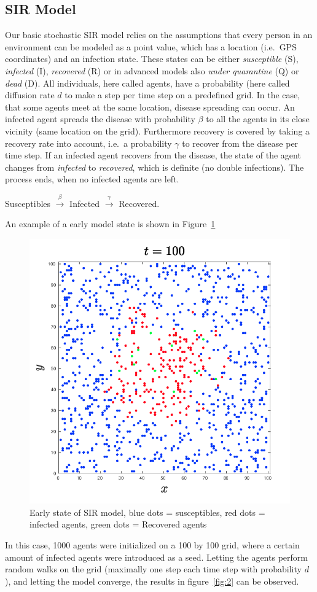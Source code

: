 \subsection{SIR Model}

Our basic stochastic SIR model relies on the assumptions that every person in an environment can be modeled as a point value, which has a location (i.e.\ GPS coordinates) and an infection state. These states can be either \textit{susceptible} (S), \textit{infected} (I), \textit{recovered} (R) or in advanced models also \textit{under quarantine} (Q) or \textit{dead} (D). All individuals, here called agents, have a probability (here called diffusion rate $d$ to make a step per time step on a predefined grid. In the case, that some agents meet at the same location, disease spreading can occur. An infected agent spreads the disease with probability $\beta$ to all the agents in its close vicinity (same location on the grid). Furthermore recovery is covered by taking a recovery rate into account, i.e.\ a probability $\gamma$ to recover from the disease per time step. If an infected agent recovers from the disease, the state of the agent changes from \textit{infected} to \textit{recovered}, which is definite (no double infections). The process ends, when no infected agents are left.
\begin{center}
	Susceptibles $\overset{\beta}{\longrightarrow}$ Infected $\overset{\gamma}{\longrightarrow}$ Recovered.
\end{center}

An example of a early model state is shown in Figure~\ref{fig:1}

\begin{figure}[H]
	\centering
	\includegraphics[width=0.4\linewidth]{initial_setup.png}
	\caption{Early state of SIR model, blue dots = susceptibles, red dots = infected agents, green dots = Recovered agents}%
	\label{fig:1}
\end{figure}

In this case, 1000 agents were initialized on a 100 by 100 grid, where a certain amount of infected agents were introduced as a seed. Letting the agents perform random walks on the grid (maximally one step each time step with probability $d$), and letting the model converge, the results in figure~\ref{fig:2} can be observed.

